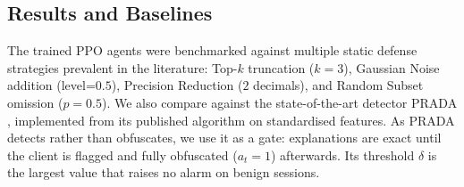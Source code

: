 \documentclass[conference]{IEEEtran}
\DeclareRobustCommand{\rev}[1]{#1}
\begin{document}
\subsection{Results and Baselines}
\label{sec:results}
The trained PPO agents were benchmarked against multiple static defense strategies prevalent in the literature: Top-$k$ truncation ($k=3$), Gaussian Noise addition (level=$0.5$), Precision Reduction ($2$ decimals), and Random Subset omission ($p=0.5$). \rev{We also compare against the state-of-the-art detector PRADA \cite{b17}, implemented from its published algorithm on standardised features. As PRADA detects rather than obfuscates, we use it as a gate: explanations are exact until the client is flagged and fully obfuscated ($a_t=1$) afterwards. Its threshold $\delta$ is the largest value that raises no alarm on benign sessions.}
\end{document}
